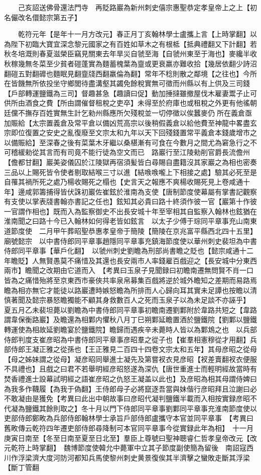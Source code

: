 　　己亥詔送佛骨還法門寺　再貶路巖為新州刺史僖宗惠聖恭定孝皇帝上之上【初名儼改名儇懿宗第五子】

　　乾符元年【是年十一月方改元】春正月丁亥翰林學士盧攜上言【上時掌翻】以為陛下初臨大寶宜深念黎元國家之有百姓如草木之有根柢【抵典禮翻又下計翻】若秋冬培溉則春夏滋榮臣竊見關東去年旱災自虢至海【自虢州東至于海也】麥纔半收秋稼幾無冬菜至少貧者磑蓬實為麵蓄槐葉為韲或更衰羸亦難收拾【幾居依翻少詩沼翻磑五對翻䃺也麵眠見翻韲牋西翻羸倫為翻】常年不稔則散之鄰境【之往也】今所在皆饑無所依投坐守鄉閭待盡溝壑其蠲免餘稅實無可徵而州縣以有上供及三司錢【戶部轉運鹽鐵為三司】督趣甚急【趣讀曰促】動加捶撻雖撤屋伐木雇妻鬻子止可供所由酒食之費【所由謂催督租稅之吏卒】未得至於府庫也或租稅之外更有他徭朝廷儻不撫存百姓實無生計乞勑州縣應所欠殘稅並一切停徵以俟蠶麥仍所在義倉亟加賑給【太宗置義倉及常平倉以備凶荒高宗以後稍假義倉以給他費至神龍中畧盡玄宗即位復置之安史之亂復廢至文宗太和九年以天下回殘錢置常平義倉本錢歲增市之以備賑給】至深春之後有菜葉木牙繼以桑椹漸有可食在今數月之間尤為窘急行之不可稽緩勑從其言而有司竟不能行徒為空文而已　路巖行至江陵勑削官爵長流儋州【儋都甘翻】巖美姿儀囚於江陵獄再宿須髪皆白尋賜自盡籍沒其家巖之為相也密奏三品以上賜死皆令使者剔取結喉三寸以進【結㗋㗋嚨上下相接之處】驗其必死至是自罹其禍所死之處乃楊收賜死之榻也【史言天之報應不爽楊收賜死見上卷咸通十年】邊咸郭籌捕得皆伏誅初巖佐崔鉉於淮南為支使【唐制節度使幕屬有掌書記觀察有支使以掌表牋書翰亦書記之任也】鉉知其必貴曰路十終須作彼一官【巖第十作彼一官謂作相也】既而入為監察御史不出長安城十年至宰相其自監察入翰林也鉉猶在淮南聞之曰路十今已入翰林如何得老皆如鉉言　以太子少傅于琮同平章事充山南東道節度使　二月甲午葬昭聖恭惠孝皇帝于簡陵【簡陵在京兆富平縣西北四十五里】廟號懿宗　以中書侍郎同平章事趙隱同平章事充鎮海節度使以華州刺史裴坦為中書侍郎同平章事【華戶化翻】　以虢州刺史劉瞻為刑部尚書瞻之貶也【懿宗咸通十二年瞻貶】人無賢愚莫不痛惜及其還也長安兩市人率錢雇百戲迎之【長安城中分東西兩市】瞻聞之改期由它道而入　【考異曰玉泉子見聞録曰初瞻南遷無問賢不肖一口皆為之痛惜殆將至京東西市豪俠共率泉帛募集百戲將逆於城外瞻知之差期而易路焉瞻為相亦無它才能徒以路巖遭時嫉怒瞻為所排而人心歸向耳其實未足譚也按瞻以清慎著聞及懿宗暴怒瞻獨能不顧其身救數百人之死而玉泉子以為未足談不亦誣乎】　夏五月乙未裴坦薨以劉瞻為中書侍郎同平章事初瞻南遷劉鄴附於韋路共短之【韋路謂韋保衡路巖】及瞻還為相鄴内懼秋八月丁巳朔鄴延瞻置酒於鹽鐵院【劉鄴以鹽鐵轉運使為相故延劉瞻宴於鹽鐵院】瞻歸而遇疾辛未薨時人皆以為鄴鴆之也　以兵部侍郎判度支崔彦昭為中書侍郎同平章事彦昭羣之從子也【崔羣相憲穆從才用翻】兵部侍郎王凝正雅之從孫也【王正雅見二百四十四卷文宗太和五年】其母彦昭之從母【母之姊妹謂之從母】凝彦昭同舉進士凝先及第嘗衩衣見彦昭【衩差賣翻衩衣便服不具禮也】且戲之曰君不若舉明經彦昭怒遂為深仇【唐世重進士而輕明經故當時有焚香禮進士設幕試明經之語崔彦昭之仇怒王凝盖以此也】及彦昭為相其母謂侍婢曰為我多作韈履【為我于偽翻】王侍郎母子必將竄逐吾當與妹偕行彦昭拜且泣謝曰必不敢凝由是獲免【考異曰此出中朝故事曰彦昭代凝判鹽鐵半載而入相按實録彦昭不代凝為鹽鐵其餘則取之】冬十月以門下侍郎同平章事劉鄴同平章事充淮南節度使以吏部侍郎鄭畋為兵部侍郎翰林學士承旨戶部侍郎盧攜守本官並同平章事　【考異曰舊畋傳云乾符四年遷吏部侍郎尋降制可本官同平章事今從實録此年為相】　十一月庚寅日南至【冬至日南至夏至日北至】羣臣上尊號曰聖神聰睿仁哲孝皇帝改元【改元乾符上時掌翻】　魏博節度使韓允中薨軍中立其子節度副使簡為留後　南詔寇西川作浮梁濟大度河防河都知兵馬使黎州刺史黄景復俟其半濟擊之蠻敗走斷其浮梁【斷丁管翻